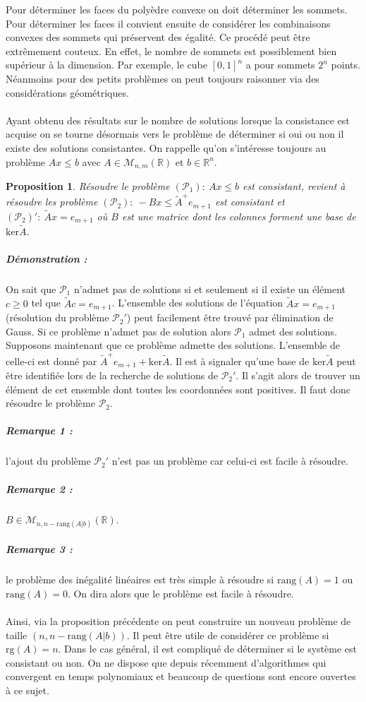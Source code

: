 \documentclass[10pt,a4paper]{article}
\newtheorem{prop}{Proposition}
\begin{document}
Pour déterminer les faces du polyèdre convexe on doit déterminer les sommets.
Pour déterminer les faces il convient ensuite de considérer les combinaisons convexes des sommets qui préservent des égalité.
Ce procédé peut être extrêmement couteux.
En effet, le nombre de sommets est possiblement bien supérieur à la dimension.
Par exemple, le cube $[0,1]^n$ a pour sommets $2^n$ points.
Néanmoins pour des petits problèmes on peut toujours raisonner via des considérations géométriques.\\
~\\
Ayant obtenu des résultats sur le nombre de solutions lorsque la consistance est acquise on se tourne désormais vers le problème de déterminer si oui ou non il existe des solutions consistantes.
On rappelle qu'on s'intéresse toujours au problème $Ax \le b$ avec $A \in \mathcal{M}_{n,m}(\mathbb{R})$ et $b \in \mathbb{R}^n$.
\begin{prop}
\label{propit}
Résoudre le problème $(\mathcal{P}_1): \ Ax \le b$ est consistant, revient à résoudre les problème $(\mathcal{P}_2): \ -Bx \le \tilde{A}^+ e_{m+1}$ est consistant et $(\mathcal{P}_2)' : \ \tilde{A} x=e_{m+1}$ où $B$ est une matrice dont les colonnes forment une base de $\text{ker}\tilde{A}$.
\end{prop}
\subparagraph{Démonstration :} On sait que $\mathcal{P}_1$ n'admet pas de solutions si et seulement si il existe un élément $c \ge 0$ tel que $\tilde{A}c=e_{m+1}$.
L'ensemble des solutions de l'équation $\tilde{A}x=e_{m+1}$ (résolution du problème $\mathcal{P}_2'$) peut facilement être trouvé par élimination de Gauss.
Si ce problème n'admet pas de solution alors $\mathcal{P}_1$ admet des solutions.
Supposons maintenant que ce problème admette des solutions.
L'ensemble de celle-ci est donné par $\tilde{A}^+e_{m+1}+\text{ker}\tilde{A}$.
Il est à signaler qu'une base de $\text{ker}\tilde{A}$ peut être identifiée lors de la recherche de solutions de $\mathcal{P}_2'$.
Il s'agit alors de trouver un élément de cet ensemble dont toutes les coordonnées sont positives.
Il faut donc résoudre le problème $\mathcal{P}_2$.\\
\subparagraph{Remarque 1 :} l'ajout du problème $\mathcal{P}_2'$ n'est pas un problème car celui-ci est facile à résoudre.
\subparagraph{Remarque 2 :} $B \in \mathcal{M}_{n,n-\text{rang}(A \vert b)}(\mathbb{R})$.
\subparagraph{Remarque 3 :} le problème des inégalité linéaires est très simple à résoudre si $\text{rang}(A)=1$ ou $\text{rang}(A)=0$.
On dira alors que le problème est facile à résoudre.\\
~\\
Ainsi, via la proposition précédente on peut construire un nouveau problème de taille $(n,n- \text{rang}(A \vert b))$.
Il peut être utile de considérer ce problème si $\text{rg}(A)=n$.
Dans le cas général, il est compliqué de déterminer si le système est consistant ou non.
On ne dispose que depuis récemment d'algorithmes qui convergent en temps polynomiaux et beaucoup de questions sont encore ouvertes à ce sujet.
\end{document}
